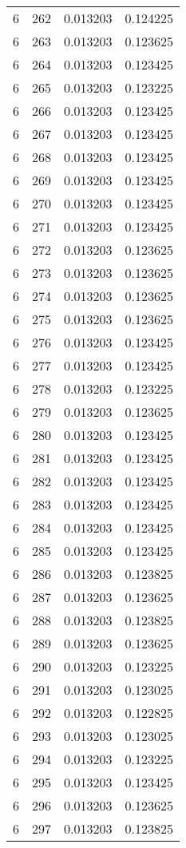 \begin{longtable}{rrrr}
6 & 262 & 0.013203 & 0.124225 \\
6 & 263 & 0.013203 & 0.123625 \\
6 & 264 & 0.013203 & 0.123425 \\
6 & 265 & 0.013203 & 0.123225 \\
6 & 266 & 0.013203 & 0.123425 \\
6 & 267 & 0.013203 & 0.123425 \\
6 & 268 & 0.013203 & 0.123425 \\
6 & 269 & 0.013203 & 0.123425 \\
6 & 270 & 0.013203 & 0.123425 \\
6 & 271 & 0.013203 & 0.123425 \\
6 & 272 & 0.013203 & 0.123625 \\
6 & 273 & 0.013203 & 0.123625 \\
6 & 274 & 0.013203 & 0.123625 \\
6 & 275 & 0.013203 & 0.123625 \\
6 & 276 & 0.013203 & 0.123425 \\
6 & 277 & 0.013203 & 0.123425 \\
6 & 278 & 0.013203 & 0.123225 \\
6 & 279 & 0.013203 & 0.123625 \\
6 & 280 & 0.013203 & 0.123425 \\
6 & 281 & 0.013203 & 0.123425 \\
6 & 282 & 0.013203 & 0.123425 \\
6 & 283 & 0.013203 & 0.123425 \\
6 & 284 & 0.013203 & 0.123425 \\
6 & 285 & 0.013203 & 0.123425 \\
6 & 286 & 0.013203 & 0.123825 \\
6 & 287 & 0.013203 & 0.123625 \\
6 & 288 & 0.013203 & 0.123825 \\
6 & 289 & 0.013203 & 0.123625 \\
6 & 290 & 0.013203 & 0.123225 \\
6 & 291 & 0.013203 & 0.123025 \\
6 & 292 & 0.013203 & 0.122825 \\
6 & 293 & 0.013203 & 0.123025 \\
6 & 294 & 0.013203 & 0.123225 \\
6 & 295 & 0.013203 & 0.123425 \\
6 & 296 & 0.013203 & 0.123625 \\
6 & 297 & 0.013203 & 0.123825 \\

\end{longtable}
